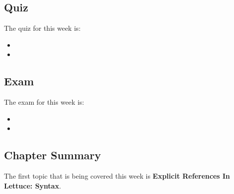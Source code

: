 \subsection{Quiz}

The quiz for this week is:

\begin{itemize}
    \item {}
    \item {}
\end{itemize}

\subsection{Exam}

The exam for this week is:

\begin{itemize}
    \item {}
    \item {}
\end{itemize}

\newpage

\subsection{Chapter Summary}

The first topic that is being covered this week is \textbf{Explicit References In Lettuce: Syntax}.

